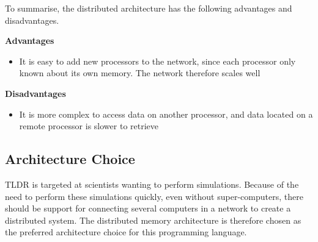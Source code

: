 To summarise, the distributed architecture has the following advantages and disadvantages.

\noindent\textbf{Advantages}
\begin{itemize}
    \item It is easy to add new processors to the network, since each processor only known about its own memory. The network therefore scales well
\end{itemize}

\noindent\textbf{Disadvantages}
\begin{itemize}
    \item It is more complex to access data on another processor, and data located on a remote processor is slower to retrieve
\end{itemize}

\subsection{Architecture Choice}

TLDR is targeted at scientists wanting to perform simulations. Because of the need to perform these simulations quickly, even without super-computers, there should be support for connecting several computers in a network to create a distributed system. The distributed memory architecture is therefore chosen as the preferred architecture choice for this programming language.
